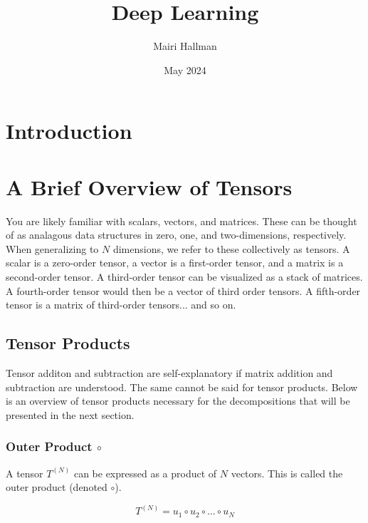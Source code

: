 \documentclass{article}
\title{Deep Learning}
\author{Mairi Hallman}
\date{May 2024}
\begin{document}
\maketitle

\newpage

\tableofcontents
\newpage

\section{Introduction}

\section{A Brief Overview of Tensors}

You are likely familiar with scalars, vectors, and matrices. These can be thought of as analagous data structures in zero, one, and two-dimensions, respectively. When generalizing to \(N\) dimensions, we refer to these collectively as tensors. A scalar is a zero-order tensor, a vector is a first-order tensor, and a matrix is a second-order tensor. A third-order tensor can be visualized as a stack of matrices. A fourth-order tensor would then be a vector of third order tensors. A fifth-order tensor is a matrix of third-order tensors... and so on.



\subsection{Tensor Products}

Tensor additon and subtraction are self-explanatory if matrix addition and subtraction are understood. The same cannot be said for tensor products. Below is an overview of tensor products necessary for the decompositions that will be presented in the next section.

\subsubsection{Outer Product \(\circ\)}

A tensor \(T^{(N)}\) can be expressed as a product of \(N\) vectors. This is called the outer product (denoted \(\circ\)).

\begin{equation}
    T^{(N)} = u_1 \circ u_2 \circ \dots \circ u_N
\end{equation}
\end{document}
